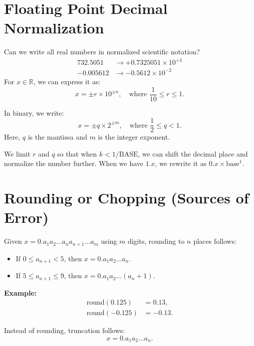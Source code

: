 \newcommand{\fl}{\operatorname{fl}}

\section{Floating Point Decimal Normalization}

Can we write all real numbers in normalized scientific notation?
\begin{align*}
    732.5051 &\rightarrow +0.7325051 \times 10^{+3} \\
    -0.005612 &\rightarrow -0.5612 \times 10^{-2}
\end{align*}
For $x \in \mathbb{R}$, we can express it as:
\begin{equation*}
    x = \pm r \times 10^{\pm n}, \quad \text{where } \frac{1}{10} \leq r \leq 1.
\end{equation*}

In binary, we write:
\begin{equation*}
    x = \pm q \times 2^{\pm m}, \quad \text{where } \frac{1}{2} \leq q < 1.
\end{equation*}
Here, $q$ is the mantissa and $m$ is the integer exponent.

We limit $r$ and $q$ so that when $k < 1/\text{BASE}$, we can shift the decimal 
place and normalize the number further. When we have $1.x$, we rewrite it 
as $0.x \times \text{base}^1$.

\section{Rounding or Chopping (Sources of Error)}

Given $x = 0.a_1 a_2 \dots a_n a_{n+1} \dots a_m$ using $m$ digits, rounding 
to $n$ places follows:
\begin{itemize}
    \item If $0 \leq a_{n+1} < 5$, then $x = 0.a_1 a_2 \dots a_n$.
    \item If $5 \leq a_{n+1} \leq 9$, then $x = 0.a_1 a_2 \dots (a_n + 1)$.
\end{itemize}

\textbf{Example:}
\begin{align*}
    \text{round}(0.125) &= 0.13, \\
    \text{round}(-0.125) &= -0.13.
\end{align*}

Instead of rounding, truncation follows:
\begin{equation*}
    x = 0.a_1 a_2 \dots a_n.
\end{equation*}

